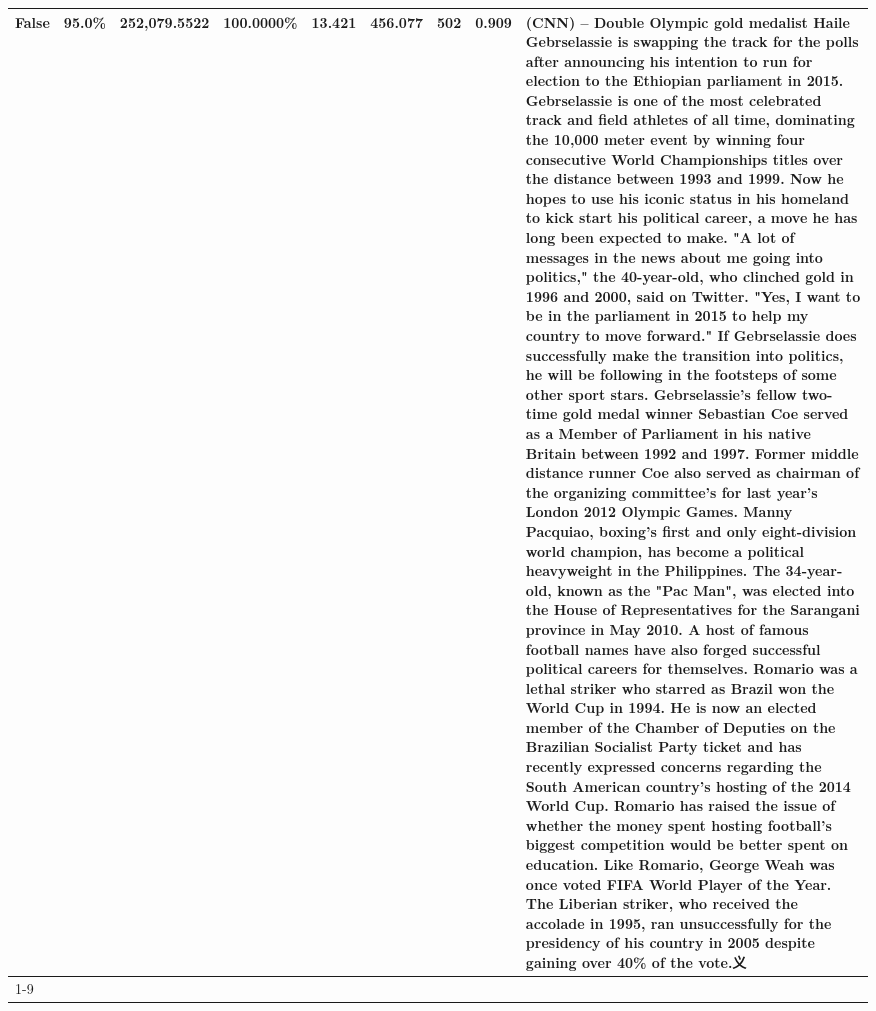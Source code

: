 \begin{table}[H]
{\begin{tabular}{lllrlllll}
False & 95.0\% & \color{red} 252,079.5522 & \bfseries \color{red} 100.0000\% & 13.421 & 456.077 & 502 & 0.909 & (CNN) -- Double Olympic gold medalist Haile Gebrselassie is swapping the track for the polls after announcing his intention to run for election to the Ethiopian parliament in 2015. Gebrselassie is one of the most celebrated track and field athletes of all time, dominating the 10,000 meter event by winning four consecutive World Championships titles over the distance between 1993 and 1999. Now he hopes to use his iconic status in his homeland to kick start his political career, a move he has long been expected to make. "A lot of messages in the news about me going into politics," the 40-year-old, who clinched gold in 1996 and 2000, said on Twitter. "Yes, I want to be in the parliament in 2015 to help my country to move forward." If Gebrselassie does successfully make the transition into politics, he will be following in the footsteps of some other sport stars. Gebrselassie's fellow two-time gold medal winner Sebastian Coe served as a Member of Parliament in his native Britain between 1992 and 1997. Former middle distance runner Coe also served as chairman of the organizing committee's for last year's London 2012 Olympic Games. Manny Pacquiao, boxing's first and only eight-division world champion, has become a political heavyweight in the Philippines. The 34-year-old, known as the "Pac Man", was elected into the House of Representatives for the Sarangani province in May 2010. A host of famous football names have also forged successful political careers for themselves. Romario was a lethal striker who starred as Brazil won the World Cup in 1994. He is now an elected member of the Chamber of Deputies on the Brazilian Socialist Party ticket and has recently expressed concerns regarding the South American country's hosting of the 2014 World Cup. Romario has raised the issue of whether the money spent hosting football's biggest competition would be better spent on education. Like Romario, George Weah was once voted FIFA World Player of the Year. The Liberian striker, who received the accolade in 1995, ran unsuccessfully for the presidency of his country in 2005 despite gaining over 40\% of the vote.义 \\
\cline{1-9}

\end{tabular}}
\end{table}
